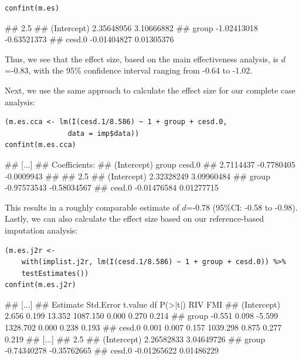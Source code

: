 \begin{lstlisting}
confint(m.es)
\end{lstlisting}

\begin{example}
##                   2.5 %
## (Intercept)  2.35648956  3.10666882
## group       -1.02413018 -0.63521373
## cesd.0      -0.01404827  0.01305376
\end{example}

Thus, we see that the effect size, based on the main effectiveness analysis, is $d$=-0.83, with the 95\% confidence interval ranging from -0.64 to -1.02.

Next, we use the same approach to calculate the effect size for our complete case analysis:

\begin{lstlisting}
(m.es.cca <- lm(I(cesd.1/8.586) ~ 1 + group + cesd.0, 
               data = imp$data))
confint(m.es.cca)
\end{lstlisting}

\begin{example}
## [...]
## Coefficients:
## (Intercept)        group       cesd.0  
##   2.7114437   -0.7780405   -0.0009943  
##
##                   2.5 %
## (Intercept)  2.32328249  3.09960484
## group       -0.97573543 -0.58034567
## cesd.0      -0.01476584  0.01277715
\end{example}

This results in a roughly comparable estimate of $d$=-0.78 (95\%CI: -0.58 to -0.98). Lastly, we can also calculate the effect size based on our reference-based imputation analysis:

\begin{lstlisting}
(m.es.j2r <- 
    with(implist.j2r, lm(I(cesd.1/8.586) ~ 1 + group + cesd.0)) %>%
    testEstimates())
confint(m.es.j2r)
\end{lstlisting}

\begin{example}
## [...]
##              Estimate Std.Error t.value       df P(>|t|)   RIV   FMI 
## (Intercept)     2.656     0.199  13.352 1087.150   0.000 0.270 0.214 
## group          -0.551     0.098  -5.599 1328.702   0.000 0.238 0.193 
## cesd.0          0.001     0.007   0.157 1039.298   0.875 0.277 0.219 
## [...]
##                   2.5 %
## (Intercept)  2.26582833  3.04649726
## group       -0.74340278 -0.35762665
## cesd.0      -0.01265622  0.01486229
\end{example}

